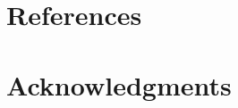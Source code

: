 

    






\section{References}
\printbibliography[heading=none]

\section{Acknowledgments}

\clearpage





